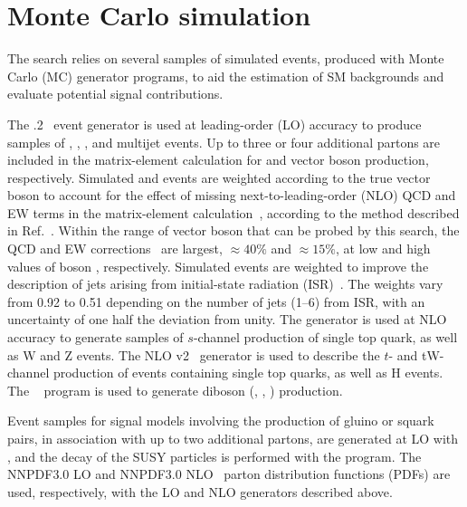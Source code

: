 \section{Monte Carlo simulation}
\label{sec:simulation}

The search relies on several samples of simulated events, produced
with Monte Carlo (MC) generator programs, to aid the estimation of SM
backgrounds and evaluate potential signal contributions.

The .2~\cite{Alwall2014} event generator is used at
leading-order (LO) accuracy to produce samples of \wj, \zj, \ttbar,
and multijet events. Up to three or four additional partons are
included in the matrix-element calculation for \ttbar and vector boson
production, respectively. Simulated \wj and \zj events are weighted
according to the true vector boson \pt to account for the effect of
missing next-to-leading-order (NLO) QCD and EW terms in the
matrix-element calculation~\cite{Alwall2014, Kuhn:2005gv}, according
to the method described in Ref.~\cite{Khachatryan:2016mdm}. Within the
range of vector boson \pt that can be probed by this search, the QCD
and EW corrections~\cite{Kuhn:2005gv} are largest, ${\approx}40\%$ and
${\approx}15\%$, at low and high values of boson \pt,
respectively. Simulated \ttbar events are weighted to improve the
description of jets arising from initial-state radiation
(ISR)~\cite{Chatrchyan:2013xna}. The weights vary from 0.92 to 0.51
depending on the number of jets (1--6) from ISR, with an uncertainty
of one half the deviation from unity. The \MGvATNLO generator is used
at NLO accuracy to generate samples of $s$-channel production of
single top quark, as well as {\ttbar}W and {\ttbar}Z events. The NLO
\POWHEG v2~\cite{powheg, powheg_top_Wt} generator is used to describe
the $t$- and tW-channel production of events containing single top
quarks, as well as {\ttbar}H events. The ~\cite{pythia}
program is used to generate diboson (\PW\PW, \PW\PcZ, \cPZ\cPZ)
production.

Event samples for signal models involving the production of gluino or
squark pairs, in association with up to two additional partons, are
generated at LO with \MGvATNLO, and the decay of the SUSY particles is
performed with the \PYTHIA program. The \textsc{NNPDF}3.0 LO and
\textsc{NNPDF}3.0 NLO~\cite{nnpdf} parton distribution functions
(PDFs) are used, respectively, with the LO and NLO generators
described above.


